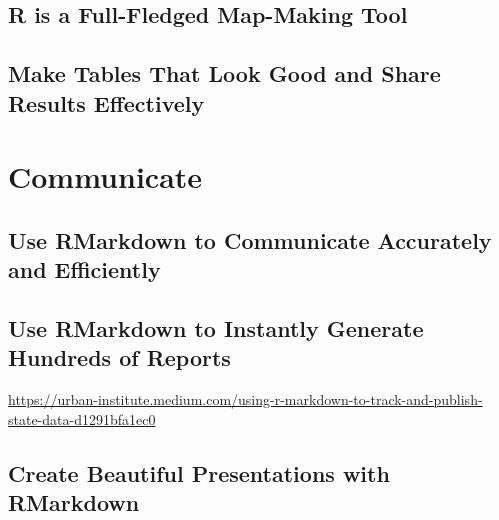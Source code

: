 \documentclass[
]{book}
\begin{document}
\hypertarget{r-is-a-full-fledged-map-making-tool}{%
\chapter*{R is a Full-Fledged Map-Making Tool}\label{r-is-a-full-fledged-map-making-tool}}

\hypertarget{make-tables-that-look-good-and-share-results-effectively}{%
\chapter*{Make Tables That Look Good and Share Results Effectively}\label{make-tables-that-look-good-and-share-results-effectively}}

\hypertarget{part-communicate}{%
\part*{Communicate}\label{part-communicate}}

\hypertarget{use-rmarkdown-to-communicate-accurately-and-efficiently}{%
\chapter*{Use RMarkdown to Communicate Accurately and Efficiently}\label{use-rmarkdown-to-communicate-accurately-and-efficiently}}

\hypertarget{use-rmarkdown-to-instantly-generate-hundreds-of-reports}{%
\chapter*{Use RMarkdown to Instantly Generate Hundreds of Reports}\label{use-rmarkdown-to-instantly-generate-hundreds-of-reports}}

\url{https://urban-institute.medium.com/using-r-markdown-to-track-and-publish-state-data-d1291bfa1ec0}

\hypertarget{create-beautiful-presentations-with-rmarkdown}{%
\chapter*{Create Beautiful Presentations with RMarkdown}\label{create-beautiful-presentations-with-rmarkdown}}
\end{document}
